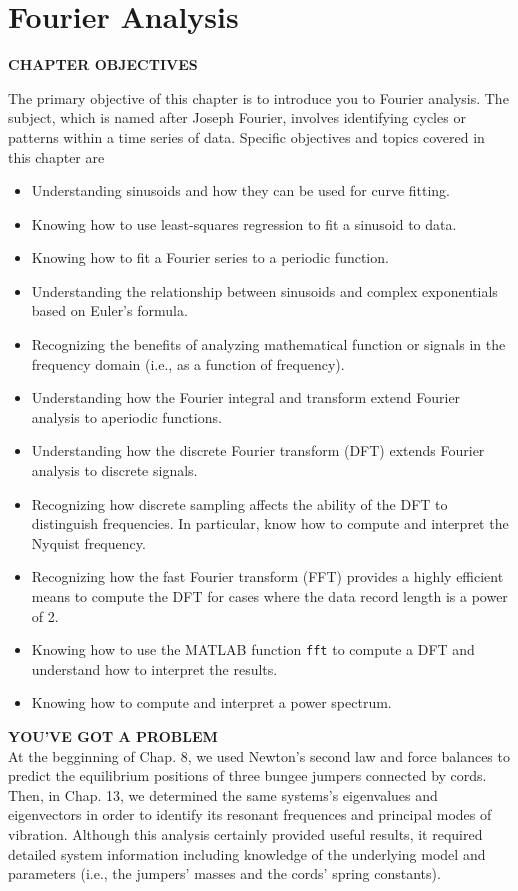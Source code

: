 \documentclass[../main.tex]{subfiles}
\begin{document}
\chapter{Fourier Analysis}
\textbf{CHAPTER OBJECTIVES}

\noindent The primary objective of this chapter is to introduce you to Fourier analysis. The
subject, which is named after Joseph Fourier, involves identifying cycles or patterns
within a time series of data. Specific objectives and topics covered in this chapter are

\begin{itemize}
	\item Understanding sinusoids and how they can be used for curve fitting.
	\item Knowing how to use least-squares regression to fit a sinusoid to data.
	\item Knowing how to fit a Fourier series to a periodic function.
	\item Understanding the relationship between sinusoids and complex exponentials
	based on Euler's formula.
	\item Recognizing the benefits of analyzing mathematical function or signals in the frequency domain (i.e., as a function of frequency).
	\item Understanding how the Fourier integral and transform extend Fourier analysis to aperiodic functions.
	\item Understanding how the discrete Fourier transform (DFT) extends Fourier analysis
	to discrete signals.
	\item Recognizing how discrete sampling affects the ability of the DFT to distinguish
	frequencies. In particular, know how to compute and interpret the Nyquist
	frequency.
	\item Recognizing how the fast Fourier transform (FFT) provides a highly efficient
	means to compute the DFT for cases where the data record length is a power of 2.
	\item Knowing how to use the MATLAB function \texttt{fft} to compute a DFT and
	understand how to interpret the results.
	\item Knowing how to compute and interpret a power spectrum.
\end{itemize}

\noindent\textbf{YOU'VE GOT A PROBLEM}\\

\noindent At the begginning of Chap. 8, we used Newton's second law and force balances to predict the equilibrium positions of three bungee jumpers connected by cords. Then, in Chap. 13, we determined the same systems's eigenvalues and eigenvectors in order to identify its resonant frequences and principal modes of vibration.
Although this analysis certainly provided useful results, it required detailed system information including
knowledge of the underlying model and parameters (i.e., the jumpers' masses and the
cords' spring constants).
\end{document}
